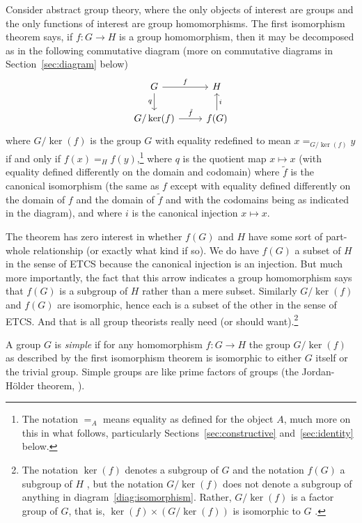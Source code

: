 \documentclass[11pt]{article}
\begin{document}
Consider abstract group theory, where the only objects of interest are groups
and the only functions of interest are group homomorphisms.
The first isomorphism theorem
\citep[of group theory,\footnote{Almost every algebraic theory
has a similar theorem, even set theory
\citep[Theorem~I.2.7]{aluffi}.}][Theorem~II.8.1]{aluffi}
says, if $f : G \to H$ is a group homomorphism,
then it may be decomposed as in the following commutative diagram
(more on commutative diagrams in Section~\ref{sec:diagram} below)
\begin{equation} \label{diag:isomorphism}
\begin{tikzcd}
   G \rar{f} \dar[swap]{q} & H \\
   G / \ker(f) \rar{\tilde{f}} & f(G) \uar[swap]{i}
\end{tikzcd}
\end{equation}
where $G / \ker(f)$ is the group $G$ with equality redefined to mean
$x =_{G / \ker(f)} y$ if and only if $f(x) =_H f(y)$,\footnote{The
notation $=_A$ means equality as defined for the object $A$, much
more on this in what follows, particularly Sections~\ref{sec:constructive}
and~\ref{sec:identity} below.}
where $q$ is the quotient map $x \mapsto x$
(with equality defined differently on the domain and codomain)
where $\tilde{f}$ is the canonical isomorphism
(the same as $f$ except with equality defined differently on the domain
of $f$ and the domain of $\tilde{f}$ and with the codomains being as
indicated in the diagram),
and where $i$  is the canonical injection $x \mapsto x$.

The theorem has zero interest in whether $f(G)$ and $H$ have some
sort of part-whole relationship (or exactly what kind if so).  We do have
$f(G)$ a subset of $H$ in the sense of ETCS because the canonical injection
is an injection.  But much more importantly, the fact that this arrow
indicates a group homomorphism says that $f(G)$ is a subgroup of $H$
rather than a mere subset.
Similarly $G / \ker(f)$ and $f(G)$ are isomorphic, hence
each is a subset of the other in the sense of ETCS.  And that is all group
theorists really need (or should want).\footnote{
The notation $\ker(f)$ denotes a subgroup of $G$ and
the notation $f(G)$ a subgroup of $H$ \citep[Section~II.6]{aluffi},
but the notation $G / \ker(f)$ does
not denote a subgroup of anything in diagram~\eqref{diag:isomorphism}.
Rather, $G / \ker(f)$ is a factor group of $G$, that is,
$\ker(f) \times (G / \ker(f))$ is isomorphic to $G$
\citep[Section~II.3.4]{aluffi}.}

A group $G$ is \emph{simple} if for any homomorphism $f : G \to H$
the group $G / \ker(f)$ as described by the first isomorphism theorem
is isomorphic to either $G$ itself or the trivial group.
Simple groups are like prime factors of groups
(the Jordan-H\"{o}lder theorem, \citealp[Theorem~IV.3.1]{aluffi}).
\end{document}
